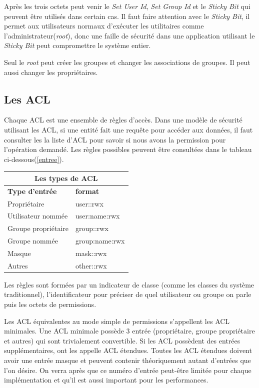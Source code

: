 Après les trois octets peut venir le \emph{Set User Id}, \emph{Set Group Id} et le \emph{Sticky Bit} qui peuvent être utilisés dans certain cas. Il faut faire attention avec le \emph{Sticky Bit}, il permet aux utilisateurs normaux d'exécuter les utilitaires comme l'administrateur(\emph{root}), donc une faille de sécurité dans une application utilisant le \emph{Sticky Bit} peut compromettre le système entier.
 
Seul le \emph{root} peut créer les groupes et changer les associations de groupes. Il peut aussi changer les propriétaires.
 
\subsection*{Les ACL}
 
Chaque ACL est une ensemble de règles d'accès. Dans une modèle de sécurité utilisant les ACL, si une entité fait une requête pour accéder aux données, il faut consulter les la liste d'ACL pour savoir si nous avons la permission pour l'opération demandé. Les règles possibles peuvent être consultées dans le tableau ci-dessous(\ref{entree}).

\begin{center}
\begin{tabular}{|l|l|}
  \hline
    \multicolumn{2}{|c|}{Les types de ACL} \\
  \hline
\textbf{Type d'entrée} & \textbf{format} \\
  \hline
Propriétaire & user::rwx \\
Utilisateur nommée & user:name:rwx \\
Groupe propriétaire & group::rwx \\
Groupe nommée & group:name:rwx \\
Masque & mask::rwx \\
Autres & other::rwx \\
  \hline
\end{tabular}
\label{tab:entree}
\end{center}
 
Les règles sont formées par un indicateur de classe (comme les classes du système traditionnel), l'identificateur pour préciser de quel utilisateur ou groupe on parle puis les octets de permissions.

Les ACL équivalentes au mode simple de permissions s'appellent les ACL minimales. Une ACL minimale possède 3 entrée (propriétaire, groupe propriétaire et autres) qui sont trivialement convertible. Si les ACL possèdent des entrées supplémentaires, ont les appelle ACL étendues. Toutes les ACL étendues doivent avoir une entrée masque et peuvent contenir théoriquement autant d'entrées que l'on désire. On verra après que ce numéro d'entrée peut-être limitée pour chaque implémentation et qu'il est aussi important pour les performances.

